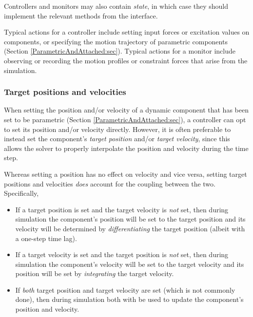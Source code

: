 Controllers and monitors may also contain {\it state}, in which case
they should implement the relevant methods from the
 interface.

Typical actions for a controller include setting input forces or
excitation values on components, or specifying the motion trajectory
of parametric components (Section \ref{ParametricAndAttached:sec}).
Typical actions for a monitor include observing or recording
the motion profiles or constraint forces that arise
from the simulation.

\subsubsection{Target positions and velocities}
\label{targetPositions:sec}

When setting the position and/or velocity of a dynamic component that has been
set to be parametric (Section \ref{ParametricAndAttached:sec}), a controller can
opt to set its position and/or velocity directly. However, it is often preferable
to instead set the component's {\it target position} and/or {\it target
velocity}, since this allows the solver to properly interpolate the position
and velocity during the time step. 

Whereas setting a position has no effect on velocity and vice versa, setting
target positions and velocities {\it does} account for the coupling between the
two. Specifically,

\begin{itemize}

\item If a target position is set and the target velocity is {\it not} set,
then during simulation the component's position will be set to the target
position and its velocity will be determined by {\it differentiating} the
target position (albeit with a one-step time lag).

\item If a target velocity is set and the target position is {\it not} set,
then during simulation the component's velocity will be set to the target
velocity and its position will be set by {\it integrating} the target velocity.

\item If {\it both} target position and target velocity are set (which is not
commonly done), then during simulation both with be used to update the
component's position and velocity.
	
\end{itemize}

